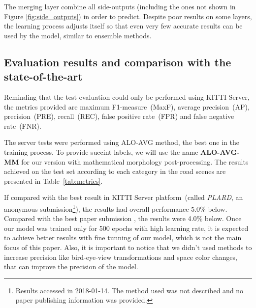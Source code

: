The merging layer combine all side-outputs (including the ones not shown in Figure \ref{fig:side_outputs}) in order to predict. Despite poor results on some layers, the learning process adjusts itself so that even very few accurate results can be used by the model, similar to ensemble methods.


\subsection{Evaluation results and comparison with the state-of-the-art}

Reminding that the test evaluation could only be performed using KITTI Server, the metrics provided are maximum F1-measure~(MaxF), average precision~(AP), precision~(PRE), recall~(REC), false positive rate~(FPR) and false negative rate~(FNR). 

The server tests were performed using ALO-AVG method, the best one in the training process. To provide succint labels, we will use the name \textbf{ALO-AVG-MM} for our version with mathematical morphology post-processing. The results achieved  on the test set according to each category in the road scenes are presented in Table~\ref{tab:metrics}. 

If compared with the best result in KITTI Server platform~(called \textit{PLARD}, an anonymous submission\footnote{Results accessed in 2018-01-14. The method used was not described and no paper publishing information was provided.}), the results had overall performance 5.0\% below. Compared with the best paper submission \cite{Caltagirone2018}, the results were 4.0\% below. Once our model was trained only for 500 epochs with high learning rate, it is expected to achieve better results with fine tunning of our model, which is not the main focus of this paper. Also, it is important to notice that we didn't used methods to increase precision like bird-eye-view transformations and space color changes, that can improve the precision of the model.

